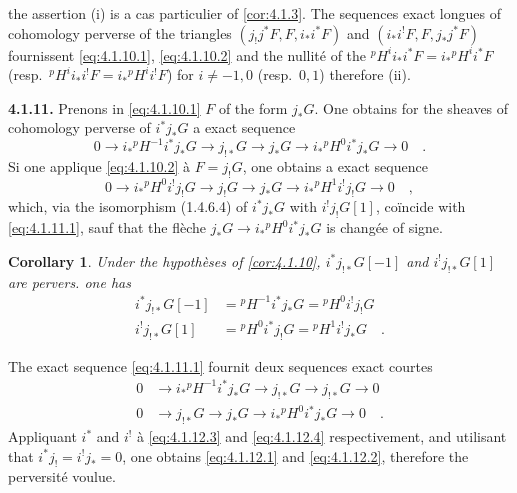 \documentclass[12pt,a4paper]{article}
\theoremstyle{plain}
\newtheorem{corollary}[theorem]{Corollary}
\theoremstyle{definition}
\begin{document}
the assertion (i) is a cas particulier of \ref{cor:4.1.3}. The sequences exact longues of cohomology perverse of the triangles $(j_{!}j^{*}F, F, i_{*}i^{*}F)$ and $(i_{*}i^{!}F, F, j_{*}j^{*}F)$ fournissent \eqref{eq:4.1.10.1}, \eqref{eq:4.1.10.2} and the nullit\'{e} of the ${}^{p}H^{i}i_{*}i^{*}F = i_{*}{}^{p}H^{i}i^{*}F$ (resp.\ ${}^{p}H^{i}i_{*}i^{!}F = i_{*}{}^{p}H^{i}i^{!}F$) for $i \neq -1,0$ (resp.\ $0,1$) therefore (ii).

\noindent\textbf{4.1.11.} Prenons in \eqref{eq:4.1.10.1} $F$ of the form $j_{*}G$. One obtains for the sheaves of cohomology perverse of $i^{*}j_{*}G$ a exact sequence
\begin{equation}\label{eq:4.1.11.1}
0 \to i_{*}{}^{p}H^{-1}i^{*}j_{*}G \to j_{!*}G \to j_{*}G \longrightarrow i_{*}{}^{p}H^{0}i^{*}j_{*}G \to 0\quad.
\end{equation}
Si one applique \eqref{eq:4.1.10.2} \`{a} $F = j_{!}G$, one obtains a exact sequence
\[
0 \to i_{*}{}^{p}H^{0}i^{!}j_{!}G \to j_{!}G \longrightarrow j_{*}G \longrightarrow i_{*}{}^{p}H^{1}i^{!}j_{!}G \to 0\quad,
\]
which, via the isomorphism (1.4.6.4) of $i^{*}j_{*}G$ with $i^{!}j_{!}G[1]$, co\"{i}ncide with \eqref{eq:4.1.11.1}, sauf that the fl\`{e}che $j_{*}G \to i_{*}{}^{p}H^{0}i^{*}j_{*}G$ is chang\'{e}e of signe.

\begin{corollary}\label{cor:4.1.12}
Under the hypoth\`{e}ses of \ref{cor:4.1.10}, $i^{*}j_{!*}G[-1]$ and $i^{!}j_{!*}G[1]$ are pervers. one has
\begin{align}
i^{*}j_{!*}G[-1] &= {}^{p}H^{-1}i^{*}j_{*}G = {}^{p}H^{0}i^{!}j_{!}G \label{eq:4.1.12.1}\\
i^{!}j_{!*}G[1] &= {}^{p}H^{0}i^{*}j_{!}G = {}^{p}H^{1}i^{!}j_{*}G\quad. \label{eq:4.1.12.2}
\end{align}
\end{corollary}

The exact sequence \eqref{eq:4.1.11.1} fournit deux sequences exact courtes
\begin{align}
0 &\longrightarrow i_{*}{}^{p}H^{-1}i^{*}j_{*}G \to j_{!*}G \to j_{!*}G \longrightarrow 0 \label{eq:4.1.12.3}\\
0 &\longrightarrow j_{!*}G \longrightarrow j_{*}G \to i_{*}{}^{p}H^{0}i^{*}j_{*}G \to 0\quad. \label{eq:4.1.12.4}
\end{align}
Appliquant $i^{*}$ and $i^{!}$ \`{a} \eqref{eq:4.1.12.3} and \eqref{eq:4.1.12.4} respectivement, and utilisant that $i^{*}j_{!} = i^{!}j_{*} = 0$, one obtains \eqref{eq:4.1.12.1} and \eqref{eq:4.1.12.2}, therefore the perversit\'{e} voulue.
\end{document}
